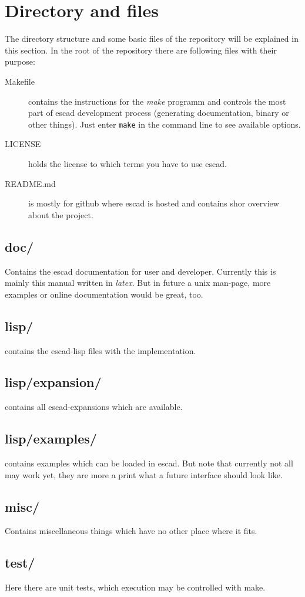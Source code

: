 \documentclass[a4paper, 12pt, openany]{scrbook}
\begin{document}
\section{Directory and files}
The directory structure and some basic files of the repository will be explained in this section. In the root of the repository there are following files with their purpose:
\begin{description}
\item[Makefile] contains the instructions for the \emph{make} programm and controls the most part of escad development process (generating documentation, binary or other things). Just enter \texttt{make} in the command line to see available options.
\item[LICENSE] holds the license to which terms you have to use escad.
\item[README.md] is mostly for github where escad is hosted and contains shor overview about the project.
\end{description}
\subsection{doc/}
Contains the escad documentation for user and developer. Currently this is mainly this manual written in \emph{latex}. But in future a unix man-page, more examples or online documentation would be great, too.
\subsection{lisp/}
 contains the escad-lisp files with the implementation.
\subsection{lisp/expansion/}
 contains all escad-expansions which are available.
\subsection{lisp/examples/}
 contains examples which can be loaded in escad. But note that currently not all may work yet, they are more a print what a future interface should look like.
\subsection{misc/}
Contains miscellaneous things which have no other place where it fits.
\subsection{test/}
Here there are unit tests, which execution may be controlled with make.
\end{document}
